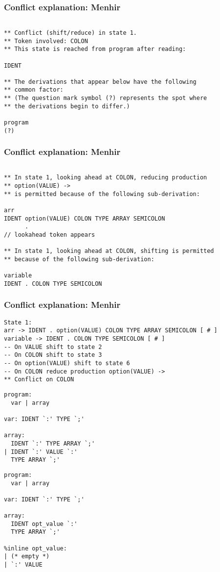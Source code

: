 \begin{frame}[fragile]
  \frametitle{Conflict explanation: Menhir}
  \begin{lstlisting}

** Conflict (shift/reduce) in state 1.
** Token involved: COLON
** This state is reached from program after reading:

IDENT

** The derivations that appear below have the following
** common factor:
** (The question mark symbol (?) represents the spot where
** the derivations begin to differ.)

program
(?)
    \end{lstlisting}
\end{frame}

\begin{frame}[fragile]
  \frametitle{Conflict explanation: Menhir}
  \begin{lstlisting}

** In state 1, looking ahead at COLON, reducing production
** option(VALUE) ->
** is permitted because of the following sub-derivation:

arr
IDENT option(VALUE) COLON TYPE ARRAY SEMICOLON
      .
// lookahead token appears

** In state 1, looking ahead at COLON, shifting is permitted
** because of the following sub-derivation:

variable
IDENT . COLON TYPE SEMICOLON
    \end{lstlisting}
\end{frame}

\begin{frame}[fragile]
  \frametitle{Conflict explanation: Menhir}
  \begin{lstlisting}
State 1:
arr -> IDENT . option(VALUE) COLON TYPE ARRAY SEMICOLON [ # ]
variable -> IDENT . COLON TYPE SEMICOLON [ # ]
-- On VALUE shift to state 2
-- On COLON shift to state 3
-- On option(VALUE) shift to state 6
-- On COLON reduce production option(VALUE) ->
** Conflict on COLON
    \end{lstlisting}
\end{frame}
\lstset{basicstyle=\ttfamily\scriptsize}
\begin{lrbox}{\codebox}
  \begin{tcolorbox}[title=\centering{\%inline}\\Bison\hspace{0.45\linewidth} Menhir,sidebyside]%
  \begin{lstlisting}
program:
  var | array

var: IDENT `:' TYPE `;'

array:
  IDENT `:' TYPE ARRAY `;'
| IDENT `:' VALUE `:'
  TYPE ARRAY `;'
\end{lstlisting}
\tcblower%
  \begin{lstlisting}
program:
  var | array

var: IDENT `:' TYPE `;'

array:
  IDENT opt_value `:'
  TYPE ARRAY `;'

%inline opt_value:
| (* empty *)
| `:' VALUE
  \end{lstlisting}
  \end{tcolorbox}
\end{lrbox}

